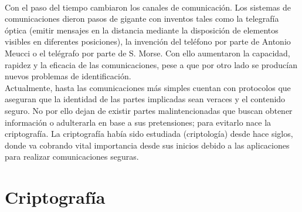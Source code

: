 \documentclass[../PFC.tex]{subfiles}
\begin{document}
\*
\vspace{0.5515cm}
\\
Con el paso del tiempo cambiaron los canales de comunicación. Los sistemas de comunicaciones dieron pasos de gigante con inventos tales como la telegrafía óptica (emitir mensajes en la distancia mediante la disposición de elementos visibles en diferentes posiciones), la invención del teléfono por parte de Antonio Meucci o el telégrafo por parte de S. Morse. Con ello aumentaron la capacidad, rapidez y la eficacia de las comunicaciones, pese a que por otro lado se producían nuevos problemas de identificación.
\*
\vspace{0.5515cm}
\\
Actualmente, hasta las comunicaciones más simples cuentan con protocolos que aseguran que la identidad de las partes implicadas sean veraces y el contenido seguro. No por ello dejan de existir partes malintencionadas que buscan obtener información o adulterarla en base a sus pretensiones; para evitarlo nace la criptografía. La criptografía había sido estudiada (criptología) desde hace siglos, donde va cobrando vital importancia desde sus inicios debido a las aplicaciones para realizar comunicaciones seguras.

\section{Criptografía}
\label{Criptografía}
\end{document}
